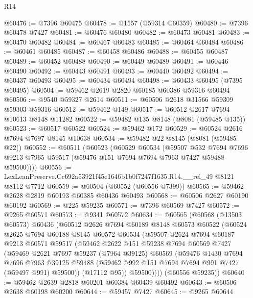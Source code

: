 \begin{lexlean}{R14}
\begin{coremodule}
@60476 := @7396 @60475
@60478 := @1557 (@59314 @60359)
@60480 := @7396 @60478 @7427
@60481 := @60476 @60480
@60482 := @60473 @60481
@60483 := @60470 @60482
@60484 := @60467 @60483
@60485 := @60464 @60484
@60486 := @60461 @60485
@60487 := @60458 @60486
@60488 := @60455 @60487
@60489 := @60452 @60488
@60490 := @60449 @60489
@60491 := @60446 @60490
@60492 := @60443 @60491
@60493 := @60440 @60492
@60494 := @60437 @60493
@60495 := @60434 @60494
@60498 := @60433 @60495 (@7395 @60495)
@60504 := @59462 @2619 @2820 @60185 @60386 @59316 @60494
@60506 := @9540 @59327 @2614
@60511 := @60506 @2618 @31566 @59309 @59303 @59316
@60512 := @59462 @149
@60517 := @60512 @2617 @7694 @10613 @8148 @11282
@60522 := @59482 @135 @8148 (@8081 (@59485 @135))
@60523 := @60517 @60522
@60524 := @59462 @172
@60529 := @60524 @2616 @7694 @7697 @8145 @10638
@60534 := @59482 @22 @8145 (@8081 (@59485 @22))
@60552 := @60511
    (@60523
      (@60529
        @60534
        (@59507
          @532
          @7694
          @7696
          @9213
          @7965
          @59517
          (@59476 @151 @7694 @7694 @7963 @7427 @59488 @59500))))
@60556 := LexLeanPreserve.Cc692a53921f45e1646b1b0f7247f1635.R14.__rel_49 @8121 @8112 @7712
@60559 := @60504 (@60552 (@60556 @7399))
@60565 := @59462 @2628 @2819 @60193 @60385 @60436 @60493
@60568 := @60506 @2627 @60190 @60192
@60569 := @225 @59235
@60571 := @7396 @60569 @7427
@60572 := @9265 @60571
@60573 := @9341 @60572
@60634 := @60565
    (@60568
      (@13503 @60573)
      @60436
      (@60512
        @2626
        @7694
        @60189
        @8148
        @60573
        @60522
        (@60524
          @2625
          @7694
          @60188
          @8145
          @60572
          @60534
          (@59507
            @2624
            @7694
            @60187
            @9213
            @60571
            @59517
            (@59462
              @2622
              @151
              @59238
              @7694
              @60569
              @7427
              (@59469
                @2621
                @7697
                @59237
                (@7964 @39125)
                @60569
                (@59476
                  @1430
                  @7694
                  @7696
                  @7963
                  @39125
                  @59488
                  (@59462 @992 @151 @7694 @7694 @991 @7427 (@59497 @991) @59500))
                (@17112 @95))
              @59500))))
      (@60556 @59235))
@60640 := @59462 @2639 @2818 @60201 @60384 @60439 @60492
@60643 := @60506 @2638 @60198 @60200
@60644 := @59457 @7427
@60645 := @9265 @60644

\end{coremodule}
\end{lexlean}

